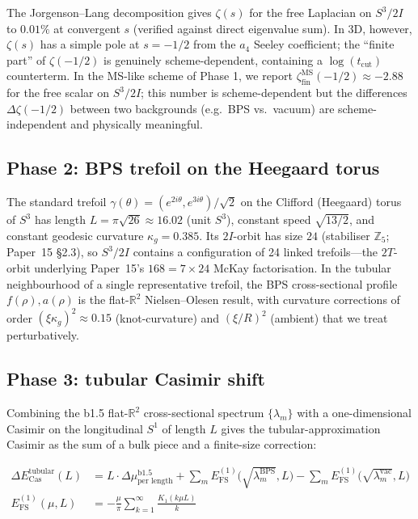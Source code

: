 \documentclass[11pt]{article}
\begin{document}
The Jorgenson--Lang decomposition gives $\zeta(s)$ for the free
Laplacian on $S^3/2I$ to $0.01\%$ at convergent $s$ (verified against
direct eigenvalue sum).  In 3D, however, $\zeta(s)$ has a simple
pole at $s = -1/2$ from the $a_4$ Seeley coefficient; the ``finite
part'' of $\zeta(-1/2)$ is genuinely scheme-dependent, containing a
$\log(t_\text{cut})$ counterterm.  In the MS-like scheme of Phase 1,
we report $\zeta_\text{fin}^\text{MS}(-1/2) \approx -2.88$ for the
free scalar on $S^3/2I$; this number is scheme-dependent but the
differences $\Delta \zeta(-1/2)$ between two backgrounds (e.g.\ BPS
vs.\ vacuum) are scheme-independent and physically meaningful.

\subsection{Phase 2: BPS trefoil on the Heegaard torus}

The standard trefoil $\gamma(\theta) = (e^{2 i \theta},
e^{3 i \theta}) / \sqrt{2}$ on the Clifford (Heegaard) torus of
$S^3$ has length $L = \pi \sqrt{26} \approx 16.02$ (unit $S^3$),
constant speed $\sqrt{13/2}$, and constant geodesic curvature
$\kappa_g = 0.385$.  Its $2I$-orbit has size $24$ (stabiliser
$\mathbb{Z}_5$; Paper~15 \S2.3), so $S^3/2I$ contains a configuration
of 24 linked trefoils---the $2T$-orbit underlying Paper~15's
$168 = 7 \times 24$ McKay factorisation.  In the tubular
neighbourhood of a single representative trefoil, the BPS
cross-sectional profile $f(\rho), a(\rho)$ is the flat-$\mathbb{R}^2$
Nielsen--Olesen result, with curvature corrections of order
$(\xi \kappa_g)^2 \approx 0.15$ (knot-curvature) and $(\xi / R)^2$
(ambient) that we treat perturbatively.

\subsection{Phase 3: tubular Casimir shift}

Combining the b1.5 flat-$\mathbb{R}^2$ cross-sectional spectrum
$\{\lambda_m\}$ with a one-dimensional Casimir on the longitudinal
$S^1$ of length $L$ gives the tubular-approximation Casimir as the
sum of a bulk piece and a finite-size correction:

\begin{align}
  \Delta E_\text{Cas}^\text{tubular}(L)
  &= L \cdot \Delta\mu^\text{b1.5}_\text{per length}
   + \sum_m E_\text{FS}^{(1)}\bigl(\sqrt{\lambda_m^\text{BPS}}, L\bigr)
   - \sum_m E_\text{FS}^{(1)}\bigl(\sqrt{\lambda_m^\text{vac}}, L\bigr) \\
  E_\text{FS}^{(1)}(\mu, L)
  &= -\frac{\mu}{\pi} \sum_{k=1}^\infty \frac{K_1(k \mu L)}{k}
\end{align}
\end{document}

